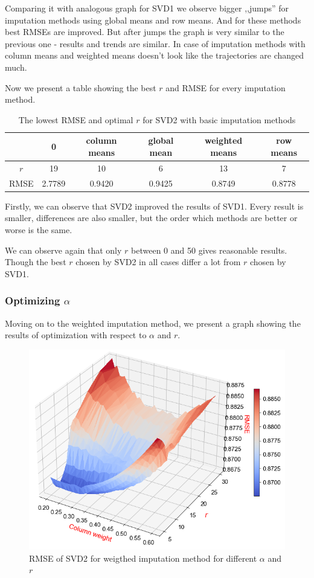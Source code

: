 \documentclass[11pt]{amsart}
\newcommand{\tami}[1]{{\textcolor{magenta}{#1}}}
\begin{document}
Comparing it with analogous graph for SVD1 we observe bigger ,,jumps'' for imputation methods using global means and row means.
And for these methods best RMSEs are improved.
But after jumps the graph is very similar to the previous one - results and trends are similar.
In case of imputation methods with column means and weighted means doesn't look like the trajectories are changed much.

Now we present a table showing the best $r$ and RMSE for every imputation method.
\begin{table}[H]
\begin{tabular}{c|ccccc}
& 0 & column means & global mean & weighted means & row means \\
\hline
$r$ & 19 & 10 & 6 & 13 & 7 \\
RMSE & 2.7789 & 0.9420 & 0.9425 & 0.8749 & 0.8778 \\
\end{tabular}
\caption{The lowest RMSE and optimal $r$ for SVD2 with basic imputation methods}
\end{table}

Firstly, we can observe that SVD2 improved the results of SVD1.
Every result is smaller, differences are also smaller, but the order which methods are better or worse is the same.

We can observe again that only $r$ between 0 and 50 gives reasonable results.
Though the best $r$ chosen by SVD2 in all cases differ a lot from $r$ chosen by SVD1.

\subsubsection*{Optimizing $\alpha$}
Moving on to the weighted imputation method, we present a graph showing the results of optimization with respect to $\alpha$ and $r$.
\begin{figure}[H]
\includegraphics[scale = 0.6]{svd2_r_w2}
\caption{RMSE of SVD2 for weigthed imputation method for different $\alpha$ and $r$}
\end{figure}
\end{document}

